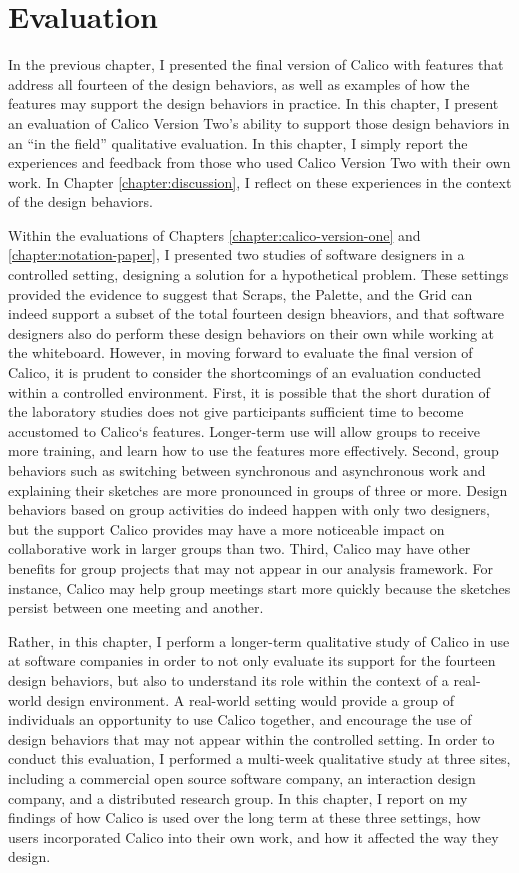 \chapter{Evaluation}
\label{chapter:evaluation}

In the previous chapter, I presented the final version of Calico with features that address all fourteen of the design behaviors, as well as examples of how the features may support the design behaviors in practice. In this chapter, I present an evaluation of Calico Version Two's ability to support those design behaviors in an ``in the field'' qualitative evaluation. In this chapter, I simply report the experiences and feedback from those who used Calico Version Two with their own work. In Chapter \ref{chapter:discussion}, I reflect on these experiences in the context of the design behaviors.

Within the evaluations of Chapters \ref{chapter:calico-version-one} and \ref{chapter:notation-paper}, I presented two studies of software designers in a controlled setting, designing a solution for a hypothetical problem. These settings provided the evidence to suggest that Scraps, the Palette, and the Grid can indeed support a subset of the total fourteen design bheaviors, and that software designers also do perform these design behaviors on their own while working at the whiteboard. However, in moving forward to evaluate the final version of Calico, it is prudent to consider the shortcomings of an evaluation conducted within a controlled environment. First, it is possible that the short duration of the laboratory studies does not give participants sufficient time to become accustomed to Calico`s features. Longer-term use will allow groups to receive more training, and learn how to use the features more effectively. Second, group behaviors such as switching between synchronous and asynchronous work and explaining their sketches are more pronounced in groups of three or more. Design behaviors based on group activities do indeed happen with only two designers, but the support Calico provides may have a more noticeable impact on collaborative work in larger groups than two. Third, Calico may have other benefits for group projects that may not appear in our analysis framework. For instance, Calico may help group meetings start more quickly because the sketches persist between one meeting and another.

Rather, in this chapter, I  perform a longer-term qualitative study of Calico in use at software companies in order to not only evaluate its support for the fourteen design behaviors, but also to understand its role within the context of a real-world design environment. A real-world setting would provide a group of individuals an opportunity to use Calico together, and encourage the use of design behaviors that may not appear within the controlled setting. In order to conduct this evaluation, I performed a multi-week qualitative study at three sites, including a commercial open source software company, an interaction design company, and a distributed research group. In this chapter, I report on my findings of how Calico is used over the long term at these three settings, how users incorporated Calico into their own work, and how it affected the way they design.

